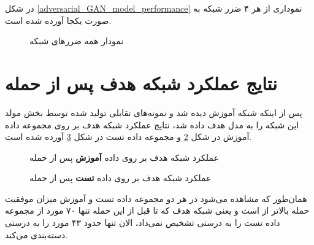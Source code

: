 \newpage
در شکل
\ref{adversarial_GAN_model_performance}
نموداری از هر ۴ ضرر شبکه‌
به صورت یکجا آورده شده است.
\begin{figure}[H]
	\caption{نمودار همه ضررهای شبکه
		}
	\label{GAN_model_performance}
\end{figure}

\newpage
\section{نتایج عملکرد شبکه هدف پس از حمله}
پس از اینکه شبکه 
آموزش دیده شد و نمونه‌های تقابلی تولید شده توسط بخش مولد این شبکه را به مدل هدف داده شد، نتایج عملکرد شبکه هدف بر روی مجموعه داده آموزش در شکل 
\ref{trainset_statistics}
و مجموعه داده تست در شکل 
\ref{testset_statistics}
آورده شده است.
\begin{figure}[H]
	\caption{عملکرد شبکه هدف بر روی داده
		 \textbf{آموزش}
		  پس از حمله}
	\label{trainset_statistics}
\end{figure}
\begin{figure}[H]
	\caption{عملکرد شبکه هدف بر روی داده
		 \textbf{تست}
		  پس از حمله}
	\label{testset_statistics}
\end{figure}
همان‌طور که مشاهده می‌شود در هر دو مجموعه داده تست و آموزش میزان موفقیت حمله بالاتر از
است و یعنی شبکه‌ هدف که تا قبل از این حمله تنها ۷۰ مورد از مجموعه داده تست را به درستی تشخیص نمی‌داد، الان تنها حدود ۴۳ مورد را به درستی دسته‌بندی می‌کند.
\newpage

